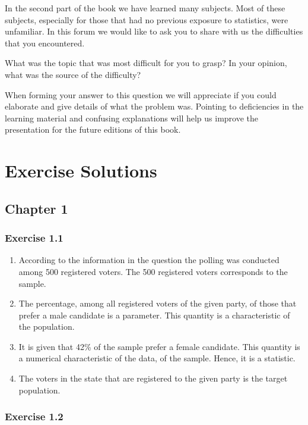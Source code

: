 \documentclass[]{krantz}
\theoremstyle{definition}
\theoremstyle{definition}
\theoremstyle{definition}
\theoremstyle{remark}
\begin{document}
In the second part of the book we have learned many subjects. Most of
these subjects, especially for those that had no previous exposure to
statistics, were unfamiliar. In this forum we would like to ask you to
share with us the difficulties that you encountered.

What was the topic that was most difficult for you to grasp? In your
opinion, what was the source of the difficulty?

When forming your answer to this question we will appreciate if you
could elaborate and give details of what the problem was. Pointing to
deficiencies in the learning material and confusing explanations will
help us improve the presentation for the future editions of this book.

\chapter*{Exercise Solutions}\label{exercise-solutions}


\section*{Chapter 1}\label{chapter-1}


\subsection*{Exercise 1.1}\label{exercise-1.1}


\begin{enumerate}
\def\labelenumi{\arabic{enumi}.}
\item
  According to the information in the question the polling was conducted
  among 500 registered voters. The 500 registered voters corresponds to
  the sample.
\item
  The percentage, among all registered voters of the given party, of
  those that prefer a male candidate is a parameter. This quantity is a
  characteristic of the population.
\item
  It is given that 42\% of the sample prefer a female candidate. This
  quantity is a numerical characteristic of the data, of the sample.
  Hence, it is a statistic.
\item
  The voters in the state that are registered to the given party is the
  target population.
\end{enumerate}

\subsection*{Exercise 1.2}\label{exercise-1.2}
\end{document}
